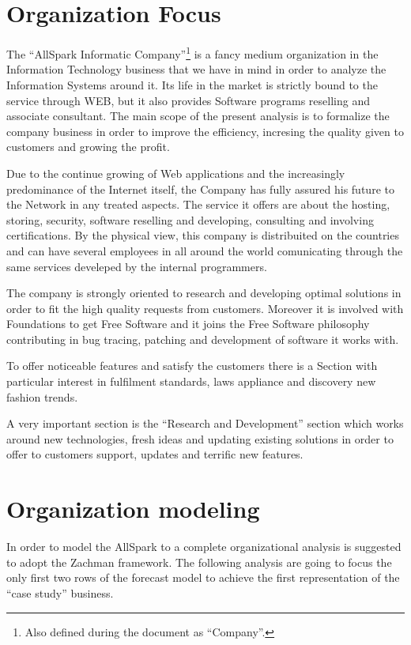\chapter*{Organization Focus}
\label{chap:Organization_focus}
The ``AllSpark Informatic Company''\footnote{Also defined during the document as ``Company''.} is a fancy medium organization in the Information Technology business that we have in mind in order to analyze the Information Systems around it. Its life in the market is strictly bound to the service through WEB, but it also provides Software programs reselling and associate consultant. The main scope of the present analysis is to formalize the company business in order to improve the efficiency, incresing the quality given to customers and growing the profit.


Due to the continue growing of Web applications and the increasingly predominance of the Internet itself, the Company has fully assured his future to the Network in any treated aspects. The service it offers are about the hosting, storing, security, software reselling and developing, consulting and involving certifications. By the physical view, this company is distribuited on the countries and can have several employees in all around the world comunicating through the same services develeped by the internal programmers.


The company is strongly oriented to research and developing optimal solutions in order to fit the high quality requests from customers. Moreover it is involved with Foundations to get Free Software and it joins the Free Software philosophy contributing in bug tracing, patching and development of software it works with.


To offer noticeable features and satisfy the customers there is a Section with particular interest in fulfilment standards, laws appliance and discovery new fashion trends.


A very important section is the ``Research and Development'' section which works around new technologies, fresh ideas and updating existing solutions in order to offer to customers support, updates and terrific new features.



\chapter{Organization modeling}
\label{chap:Organization_modeling}
In order to model the AllSpark to a complete organizational analysis is suggested to adopt the Zachman framework. The following analysis are going to focus the only first two rows of the forecast model to achieve the first representation of the ``case study'' business.

